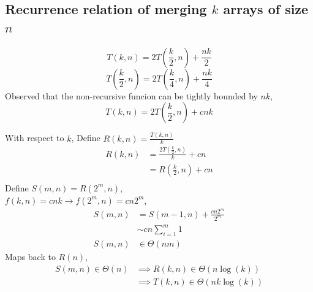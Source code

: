 \documentclass{article}
\begin{document}
\subsection*{Recurrence relation of merging $k$ arrays of size $n$}
\[T(k, n) = 2T(\frac{k}{2}, n) + \frac{nk}{2}\]
\[T(\frac{k}{2}, n) = 2T(\frac{k}{4}, n) + \frac{nk}{4}\]
Observed that the non-recursive funcion can be tightly bounded by $nk$,
\[T(k, n) = 2T(\frac{k}{2}, n) + cnk\]


With respect to $k$, Define $R(k, n) = \frac{T(k, n)}{k}$
\begin{align*}
    R(k, n) &= \frac{2 T(\frac{k}{2}, n)}{k} + cn\\
    &= R(\frac{k}{2}, n) + cn\\
\end{align*}
Define $S(m, n) = R(2^m, n)$,\\
$f(k, n) = cnk \rightarrow f(2^m, n) = cn2^m$, 
\begin{align*}
    S(m, n) &= S(m - 1, n) + \frac{cn2^m}{2^m}\\
    & \sim cn\sum_{i=1}^{m} 1\\
    S(m, n) &\in \Theta(nm)
\end{align*}
Maps back to $R(n)$,
\begin{align*}
    S(m, n) \in \Theta(n) &\implies R(k, n) \in \Theta(n\log(k))\\
    &\implies T(k, n) \in \Theta(nk\log(k))
\end{align*}
\end{document}
